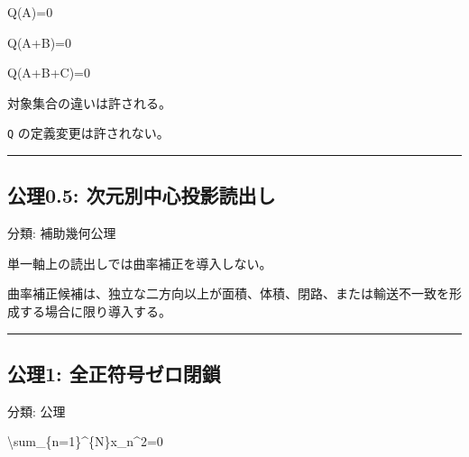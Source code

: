\documentclass[
  a4paper,
]{ltjsarticle}
\newenvironment{Shaded}{}{}
\newcommand{\NormalTok}[1]{#1}
\begin{document}
\begin{Shaded}
\begin{Highlighting}[]
\NormalTok{Q(A)=0}
\end{Highlighting}
\end{Shaded}

\begin{Shaded}
\begin{Highlighting}[]
\NormalTok{Q(A+B)=0}
\end{Highlighting}
\end{Shaded}

\begin{Shaded}
\begin{Highlighting}[]
\NormalTok{Q(A+B+C)=0}
\end{Highlighting}
\end{Shaded}

対象集合の違いは許される。

\texttt{Q} の定義変更は許されない。

\begin{center}\rule{0.5\linewidth}{0.5pt}\end{center}

\subsection{公理0.5:
次元別中心投影読出し}\label{ux516cux74060.5-ux6b21ux5143ux5225ux4e2dux5fc3ux6295ux5f71ux8aadux51faux3057}

分類: 補助幾何公理

単一軸上の読出しでは曲率補正を導入しない。

曲率補正候補は、独立な二方向以上が面積、体積、閉路、または輸送不一致を形成する場合に限り導入する。

\begin{center}\rule{0.5\linewidth}{0.5pt}\end{center}

\subsection{公理1:
全正符号ゼロ閉鎖}\label{ux516cux74061-ux5168ux6b63ux7b26ux53f7ux30bcux30edux9589ux9396}

分類: 公理

\begin{Shaded}
\begin{Highlighting}[]
\NormalTok{\textbackslash{}sum\_\{n=1\}\^{}\{N\}x\_n\^{}2=0}
\end{Highlighting}
\end{Shaded}
\end{document}
